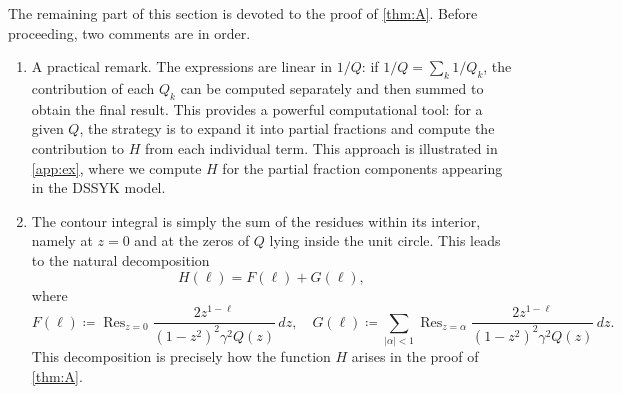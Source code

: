 \documentclass[a4paper,11pt,english]{article}
\theoremstyle{plain}
\theoremstyle{definition}
\theoremstyle{plain}
\DeclareMathOperator*{\Res}{Res}
\begin{document}
The remaining part of this section is devoted to the proof of \cref{thm:A}. Before proceeding, two comments are in order.
\begin{enumerate}
    \item A practical remark. The expressions are linear in $1/Q$: if $1/Q = \sum_{k} 1/Q_k$, the contribution of each $Q_k$ can be computed separately and then summed to obtain the final result. This provides a powerful computational tool: for a given $Q$, the strategy is to expand it into partial fractions and compute the contribution to $H$ from each individual term. This approach is illustrated in \cref{app:ex}, where we compute $H$ for the partial fraction components appearing in the DSSYK model.

    \item The contour integral is simply the sum of the residues within its interior, namely at $z = 0$ and at the zeros of $Q$ lying inside the unit circle. This leads to the natural decomposition
    \begin{equation}\label{eq:splitting}
        H(\ell) = F(\ell) + G(\ell),
    \end{equation}
    where
    \begin{equation}\label{eq:F:G}
        F(\ell)
        \coloneqq
        \Res_{z = 0} \frac{2z^{1 - \ell}}{(1-z^2)^2 \gamma^2 Q(z)}\,dz,
        \quad
        G(\ell)
        \coloneqq
        \sum_{|\alpha|<1}
            \Res_{z = \alpha} \frac{2 z^{1 - \ell}}{(1-z^2)^2 \gamma^2 Q(z)}\,dz.
    \end{equation}
    This decomposition is precisely how the function $H$ arises in the proof of \cref{thm:A}.
\end{enumerate}

\end{document}
